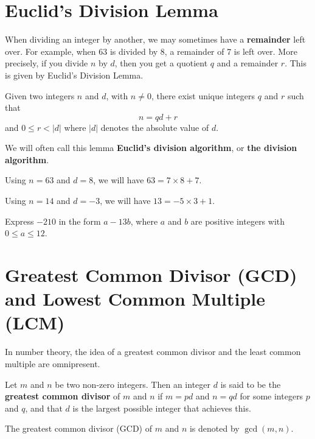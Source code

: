 \section{Euclid's Division Lemma}
When dividing an integer by another, we may sometimes have a \textbf{remainder} left over. For example, when 63 is divided by 8, a remainder of 7 is left over. More precisely, if you divide $n$ by $d$, then you get a quotient $q$ and a remainder $r$. This is given by Euclid's Division Lemma.
\begin{lemma}
    Given two integers $n$ and $d$, with $n \neq 0$, there exist unique integers $q$ and $r$ such that
    \[
        n = qd + r
    \]
    and $0 \leq r < |d|$ where $|d|$ denotes the absolute value of $d$.
\end{lemma}
\begin{remark}
    We will often call this lemma \textbf{Euclid's division algorithm}, or \textbf{the division algorithm}.
\end{remark}

\begin{example}
    Using $n = 63$ and $d = 8$, we will have $63 = 7\times8 + 7$.
\end{example}
\begin{example}
    Using $n = 14$ and $d = -3$, we will have $13 = -5\times3 + 1$.
\end{example}

\begin{exercise}
    Express $-210$ in the form $a-13b$, where $a$ and $b$ are positive integers with $0 \leq a \leq 12$.
\end{exercise}

\section{Greatest Common Divisor (GCD) and Lowest Common Multiple (LCM)}
In number theory, the idea of a greatest common divisor and the least common multiple are omnipresent.

\begin{definition}
    Let $m$ and $n$ be two non-zero integers. Then an integer $d$ is said to be the \textbf{greatest common divisor} of $m$ and $n$ if $m = pd$ and $n = qd$ for some integers $p$ and $q$, and that $d$ is the largest possible integer that achieves this.
\end{definition}
The greatest common divisor (GCD) of $m$ and $n$ is denoted by $\gcd(m, n)$.

